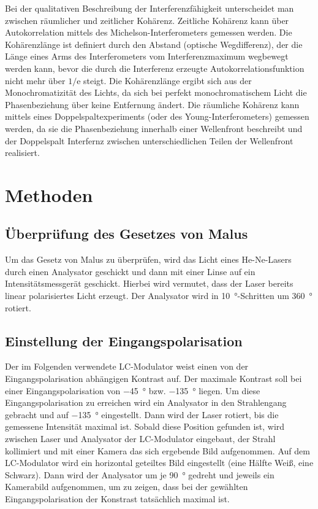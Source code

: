 \documentclass[
	a4paper,
	12pt,
	pagesize,
	ngerman
]{scrartcl}
\begin{document}
	Bei der qualitativen Beschreibung der Interferenzfähigkeit unterscheidet man zwischen räumlicher und zeitlicher Kohärenz.
	Zeitliche Kohärenz kann über Autokorrelation mittels des Michelson-Interferometers gemessen werden.
	Die Kohärenzlänge ist definiert durch den Abstand (optische Wegdifferenz), der die Länge eines Arms des Interferometers vom Interferenzmaximum wegbewegt werden kann, bevor die durch die Interferenz erzeugte Autokorrelationsfunktion nicht mehr über $1/\text{e}$ steigt.
	Die Kohärenzlänge ergibt sich aus der Monochromatizität des Lichts, da sich bei perfekt monochromatischem Licht die Phasenbeziehung über keine Entfernung ändert.
	Die räumliche Kohärenz kann mittels eines Doppelspaltexperiments (oder des Young-Interferometers) gemessen werden, da sie die Phasenbeziehung innerhalb einer Wellenfront beschreibt und der Doppelspalt Interfernz zwischen unterschiedlichen Teilen der Wellenfront realisiert.


	\section{Methoden}

	\subsection{Überprüfung des Gesetzes von Malus}
	Um das Gesetz von Malus zu überprüfen, wird das Licht eines He-Ne-Lasers durch einen Analysator geschickt und dann mit einer Linse auf ein Intensitätsmessgerät geschickt. %
	Hierbei wird vermutet, dass der Laser bereits linear polarisiertes Licht erzeugt.
	Der Analysator wird in \SI{10}{\degree}-Schritten um \SI{360}{\degree} rotiert.

	\subsection{Einstellung der Eingangspolarisation}
	Der im Folgenden verwendete LC-Modulator weist einen von der Eingangspolarisation abhängigen Kontrast auf.
	Der maximale Kontrast soll bei einer Eingangspolarisation von \SI{-45}{\degree} bzw. \SI{-135}{\degree} liegen.
	Um diese Eingangspolarisation zu erreichen wird ein Analysator in den Strahlengang gebracht und auf \SI{-135}{\degree} eingestellt.
	Dann wird der Laser rotiert, bis die gemessene Intensität maximal ist.
	Sobald diese Position gefunden ist, wird zwischen Laser und Analysator der LC-Modulator eingebaut, der Strahl kollimiert und mit einer Kamera das sich ergebende Bild aufgenommen.
	Auf dem LC-Modulator wird ein horizontal geteiltes Bild eingestellt (eine Hälfte Weiß, eine Schwarz).
	Dann wird der Analysator um je \SI{90}{\degree} gedreht und jeweils ein Kamerabild aufgenommen, um zu zeigen, dass bei der gewählten Eingangspolarisation der Konstrast tatsächlich maximal ist. %
\end{document}

